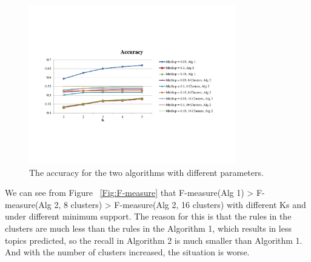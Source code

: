 \begin{figure}
\centering
\includegraphics[width=0.8\textwidth]{Accuracy}
\caption{\footnotesize The accuracy for the two algorithms with different
parameters. }
\label{Fig:Accuracy}
\end{figure}

We can see from Figure ~\ref{Fig:F-measure} that F-measure(Alg 1) > F-measure(Alg 2, 8 clusters) > F-measure(Alg 2, 16 clusters) with different Ks and under different minimum support. The reason for this is that  the rules in the clusters are much less than the rules in the Algorithm 1, which results in less topics predicted, so the recall in Algorithm 2 is much smaller than Algorithm 1. And with the number of clusters increased, the situation is worse.

